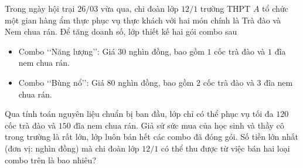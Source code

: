 \begin{ex}%
	Trong ngày hội trại $26/03$ vừa qua, chi đoàn lớp $12/1$ trường THPT $A$ tổ chức một gian hàng ẩm thực phục vụ thực khách với hai món chính là Trà đào và Nem chua rán. Để tăng doanh số, lớp thiết kế hai gói combo sau
	\begin{itemize}
		\item Combo \lq\lq Năng lượng\rq\rq: Giá $30$ nghìn đồng, bao gồm $1$ cốc trà đào và $1$ đĩa nem chua rán.
		\item Combo \lq\lq Bùng nổ\rq\rq: Giá $80$ nghìn đồng, bao gồm $2$ cốc trà đào và $3$ đĩa nem chua rán.
	\end{itemize}
	Qua tính toán nguyên liệu chuẩn bị ban đầu, lớp chỉ có thể phục vụ tối đa $120$ cốc trà đào và $150$ đĩa nem chua rán. Giả sử sức mua của học sinh và thầy cô trong trường là rất lớn, lớp luôn bán hết các combo đã đóng gói. Số tiền lớn nhất (đơn vị: nghìn đồng) mà chi đoàn lớp $12/1$ có thể thu được từ việc bán hai loại combo trên là bao nhiêu?
\end{ex}
